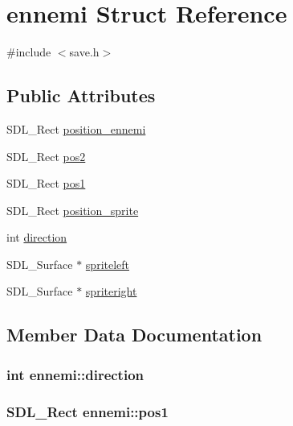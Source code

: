 \hypertarget{structennemi}{}\section{ennemi Struct Reference}
\label{structennemi}


{\ttfamily \#include $<$save.\+h$>$}

\subsection*{Public Attributes}
\begin{DoxyCompactItemize}
\item 
S\+D\+L\+\_\+\+Rect \hyperlink{structennemi_ab236808a3af75588847442504250d02f}{position\+\_\+ennemi}
\item 
S\+D\+L\+\_\+\+Rect \hyperlink{structennemi_a1fca83eeee08fde8a80a8b9c0a0ae00f}{pos2}
\item 
S\+D\+L\+\_\+\+Rect \hyperlink{structennemi_a04c7d21c26dd2fd99eceecd6059bff90}{pos1}
\item 
S\+D\+L\+\_\+\+Rect \hyperlink{structennemi_abc473e1ffbf2e5848151d900724e3f83}{position\+\_\+sprite}
\item 
int \hyperlink{structennemi_aa1f57a616910ffd5799f1097a3160e0b}{direction}
\item 
S\+D\+L\+\_\+\+Surface $\ast$ \hyperlink{structennemi_a4f333ffffb5036c74a62a60437d60422}{spriteleft}
\item 
S\+D\+L\+\_\+\+Surface $\ast$ \hyperlink{structennemi_a8ad9de831604958b2654c033280129f1}{spriteright}
\end{DoxyCompactItemize}


\subsection{Member Data Documentation}
\subsubsection[{\texorpdfstring{direction}{direction}}]{\setlength{\rightskip}{0pt plus 5cm}int ennemi\+::direction}\hypertarget{structennemi_aa1f57a616910ffd5799f1097a3160e0b}{}\label{structennemi_aa1f57a616910ffd5799f1097a3160e0b}
\subsubsection[{\texorpdfstring{pos1}{pos1}}]{\setlength{\rightskip}{0pt plus 5cm}S\+D\+L\+\_\+\+Rect ennemi\+::pos1}\hypertarget{structennemi_a04c7d21c26dd2fd99eceecd6059bff90}{}\label{structennemi_a04c7d21c26dd2fd99eceecd6059bff90}

